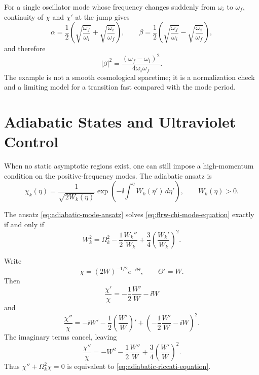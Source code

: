 \begin{example}
\label{ex:instantaneous-frequency-jump}
For a single oscillator mode whose frequency changes suddenly from
\(\omega_i\) to \(\omega_f\), continuity of \(\chi\) and \(\chi'\) at the
jump gives
\begin{equation}
  \alpha
  =
  \frac12\left(
  \sqrt{\frac{\omega_f}{\omega_i}}
  +
  \sqrt{\frac{\omega_i}{\omega_f}}
  \right),
  \qquad
  \beta
  =
  \frac12\left(
  \sqrt{\frac{\omega_f}{\omega_i}}
  -
  \sqrt{\frac{\omega_i}{\omega_f}}
  \right),
  \label{eq:sudden-quench-bogoliubov}
\end{equation}
and therefore
\begin{equation}
  |\beta|^2
  =
  \frac{(\omega_f-\omega_i)^2}{4\omega_i\omega_f}.
  \label{eq:sudden-quench-particle-number}
\end{equation}
The example is not a smooth cosmological spacetime; it is a normalization
check and a limiting model for a transition fast compared with the mode
period.
\end{example}

\section{Adiabatic States and Ultraviolet Control}

When no static asymptotic regions exist, one can still impose a
high-momentum condition on the positive-frequency modes.  The adiabatic
ansatz is
\begin{equation}
  \chi_k(\eta)
  =
  \frac{1}{\sqrt{2W_k(\eta)}}
  \exp\left(-\ii\int^\eta W_k(\eta')\,d\eta'\right),
  \qquad
  W_k(\eta)>0.
  \label{eq:adiabatic-mode-ansatz}
\end{equation}

\begin{remark}
\label{rem:adiabatic-frequency-riccati}
The ansatz \eqref{eq:adiabatic-mode-ansatz} solves
\eqref{eq:flrw-chi-mode-equation} exactly if and only if
\begin{equation}
  W_k^2
  =
  \Omega_k^2
  -\frac12\frac{W_k''}{W_k}
  +\frac34\left(\frac{W_k'}{W_k}\right)^2 .
  \label{eq:adiabatic-riccati-equation}
\end{equation}
\end{remark}

Write
\[
  \chi=(2W)^{-1/2}e^{-\ii\Theta},
  \qquad
  \Theta'=W.
  \]
Then
\[
  \frac{\chi'}{\chi}
  =
  -\frac12\frac{W'}{W}-\ii W
  \]
and
\[
  \frac{\chi''}{\chi}
  =
  -\ii W'
  -\frac12\left(\frac{W'}{W}\right)'
  +
  \left(
  -\frac12\frac{W'}{W}-\ii W
  \right)^2 .
  \]
The imaginary terms cancel, leaving
\[
  \frac{\chi''}{\chi}
  =
  -W^2
  -\frac12\frac{W''}{W}
  +\frac34\left(\frac{W'}{W}\right)^2 .
  \]
Thus \(\chi''+\Omega_k^2\chi=0\) is equivalent to
\eqref{eq:adiabatic-riccati-equation}.

